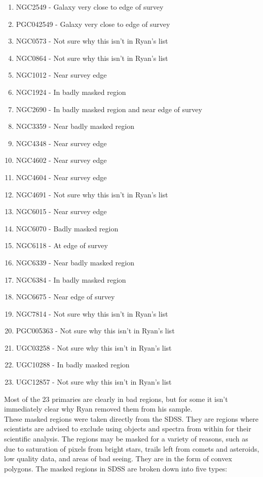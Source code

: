 \documentclass[10pt,letterpaper]{article}
\begin{document}
\begin{enumerate}
\item NGC2549 - Galaxy very close to edge of survey
\item PGC042549 - Galaxy very close to edge of survey
\item NGC0573 - Not sure why this isn't in Ryan's list
\item NGC0864 - Not sure why this isn't in Ryan's list
\item NGC1012 - Near survey edge
\item NGC1924 - In badly masked region
\item NGC2690 - In badly masked region and near edge of survey
\item NGC3359 - Near badly masked region
\item NGC4348 - Near survey edge
\item NGC4602 - Near survey edge
\item NGC4604 - Near survey edge
\item NGC4691 - Not sure why this isn't in Ryan's list
\item NGC6015 - Near survey edge
\item NGC6070 - Badly masked region
\item NGC6118 - At edge of survey
\item NGC6339 - Near badly masked region
\item NGC6384 - In badly masked region
\item NGC6675 - Near edge of survey
\item NGC7814 - Not sure why this isn't in Ryan's list
\item PGC005363 - Not sure why this isn't in Ryan's list
\item UGC03258 - Not sure why this isn't in Ryan's list
\item UGC10288 - In badly masked region
\item UGC12857 - Not sure why this isn't in Ryan's list
\end{enumerate}

Most of the 23 primaries are clearly in bad regions, but for some it isn't immediately clear why Ryan removed them from his sample.\\

These masked regions were taken directly from the SDSS. They are regions where scientists are advised to exclude using objects and spectra from within for their scientific analysis. The regions may be masked for a variety of reasons, such as due to saturation of pixels from bright stars, trails left from comets and asteroids, low quality data, and areas of bad seeing. They are in the form of convex polygons. The masked regions in SDSS are broken down into five types: \cite{image masks}
\end{document}

